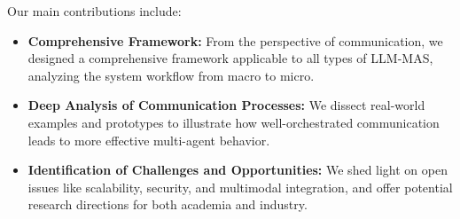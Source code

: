 Our main contributions include:
\begin{itemize}
    \item \textbf{Comprehensive Framework:} From the perspective of communication, we designed a comprehensive framework applicable to all types of LLM-MAS, analyzing the system workflow from macro to micro.
    \item \textbf{Deep Analysis of Communication Processes:} We dissect real-world examples and prototypes to illustrate how well-orchestrated communication leads to more effective multi-agent behavior.
    \item \textbf{Identification of Challenges and Opportunities:} We shed light on open issues like scalability, security, and multimodal integration, and offer potential research directions for both academia and industry.
\end{itemize}





